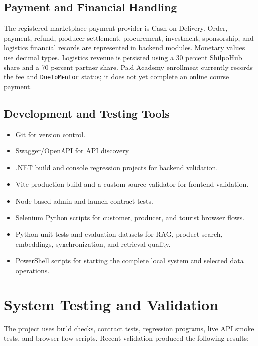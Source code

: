 \documentclass[12pt,a4paper]{report}
\begin{document}
\section{Payment and Financial Handling}

The registered marketplace payment provider is Cash on Delivery. Order, payment, refund, producer settlement, procurement, investment, sponsorship, and logistics financial records are represented in backend modules. Monetary values use decimal types. Logistics revenue is persisted using a 30 percent ShilpoHub share and a 70 percent partner share. Paid Academy enrollment currently records the fee and \texttt{DueToMentor} status; it does not yet complete an online course payment.

\section{Development and Testing Tools}

\begin{itemize}
  \item Git for version control.
  \item Swagger/OpenAPI for API discovery.
  \item .NET build and console regression projects for backend validation.
  \item Vite production build and a custom source validator for frontend validation.
  \item Node-based admin and launch contract tests.
  \item Selenium Python scripts for customer, producer, and tourist browser flows.
  \item Python unit tests and evaluation datasets for RAG, product search, embeddings, synchronization, and retrieval quality.
  \item PowerShell scripts for starting the complete local system and selected data operations.
\end{itemize}

\chapter{System Testing and Validation}

The project uses build checks, contract tests, regression programs, live API smoke tests, and browser-flow scripts. Recent validation produced the following results:
\end{document}

